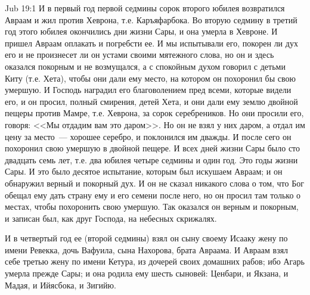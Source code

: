 \vs Jub 19:1
И в первый год первой седмины сорок второго
юбилея возвратился Авраам и жил против Хеврона,
т.е. Каръяфарбока. Во вторую седмину в третий год
этого юбилея окончились дни жизни Сары, и она
умерла в Хевроне. И пришел Авраам оплакать и
погребсти ее. И мы испытывали его, покорен ли дух
его и не произнесет ли он устами своими мятежного
слова, но он и здесь оказался покорным и не
возмущался, а с спокойным духом говорил с детьми
Киту (т.е. Хета), чтобы они дали ему место, на
котором он похоронил бы свою умершую. И Господь
наградил его благоволением пред всеми, которые
видели его, и он просил, полный смирения, детей
Хета, и они дали ему землю двойной пещеры против
Мамре, т.е. Хеврона, за сорок серебреников. Но они
просили его, говоря: <<Мы отдадим вам это
даром>>. Но он не взял у них даром, а отдал им
цену за место~--- хорошее серебро, и поклонился им
дважды. И после сего он похоронил свою умершую в
двойной пещере. И всех дней жизни Сары было сто
двадцать семь лет, т.е. два юбилея четыре седмины
и один год. Это годы жизни Сары. И это было десятое
испытание, которым был искушаем Авраам; и он
обнаружил верный и покорный дух. И он не сказал
никакого слова о том, что Бог обещал ему дать
страну ему и его семени после него, но он просил
там только о местах, чтобы похоронить свою
умершую. Так оказался он верным и покорным, и
записан был, как друг Господа, на небесных
скрижалях.

И в четвертый год ее (второй седмины) взял он
сыну своему Исааку жену по имени Ревекка, дочь
Вафуила, сына Нахорова, брата Авраама. И Авраам
взял себе третью жену по имени Кетура, из дочерей
своих домашних рабов; ибо Агарь умерла прежде
Сары; и она родила ему шесть сыновей: Ценбари, и
Якзана, и Мадая, и Ийясбока, и Зигийю.


